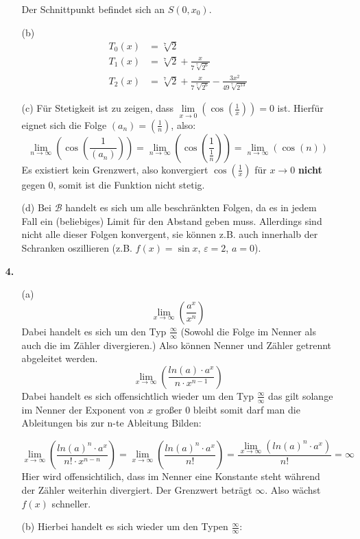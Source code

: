 \documentclass[a4paper,11pt,fleqn]{scrartcl}
\newcommand{\bra}[1]{\left(#1\right)}
\newcommand{\limxn}[2]{\lim\limits_{x \rightarrow #1}\bra{#2}}
\newcommand{\limn}[1]{\lim\limits_{n \rightarrow \infty}\bra{#1}}
\newcommand{\limx}[1]{\lim\limits_{x \rightarrow \infty}\bra{#1}}
\begin{document}
\begin{enumerate}
\begin{enumerate}
                Der Schnittpunkt befindet sich an $S(0, x_0)$.

            \item[(b)]
                \[\begin{array}{ll}
                    T_0(x) &= \sqrt[7]{2} \\[0.5em]
                    T_1(x) &= \sqrt[7]{2} + \frac{x}{7 \sqrt[7]{2^6}} \\[0.5em]
                    T_2(x) &= \sqrt[7]{2} + \frac{x}{7 \sqrt[7]{2^6}} - \frac{3x^2}{49 \sqrt[7]{2^{13}} }
                \end{array}\]

            \item[(c)]
                Für Stetigkeit ist zu zeigen, dass $\limxn{0}{\cos\bra{\frac{1}{x}}} = 0$
                ist. Hierfür eignet sich die Folge $(a_n) = (\frac{1}{n})$, also:
                \[ \limn{\cos\bra{\frac{1}{(a_n)}}} =
                \limn{\cos\bra{\frac{1}{\frac{1}{n}}}} =
                \limn{\cos\bra{n}} \]
                Es existiert kein Grenzwert, also konvergiert $\cos\bra{\frac{1}{x}}$
                für $x \rightarrow 0$ \textbf{nicht} gegen $0$, somit ist die
                Funktion nicht stetig.

            \item[(d)]
                Bei $\mathcal{B}$ handelt es sich um alle beschränkten Folgen, da
                es in jedem Fall ein (beliebiges) Limit für den Abstand geben
                muss. Allerdings sind nicht alle dieser Folgen konvergent, sie
                können z.B. auch innerhalb der Schranken oszillieren (z.B.
                $f(x) = \sin x$, $\varepsilon = 2$, $a = 0$).

        \end{enumerate}
    \item[\textbf{4.}]
        \begin{enumerate}
            \item[(a)]
                \[ \limx{ \frac{a^x}{x^n} }\] Dabei handelt es sich um den Typ $\frac{\infty}{\infty}$ (Sowohl die Folge im Nenner als auch die im Zähler divergieren.)
                Also können Nenner und Zähler getrennt abgeleitet werden. 
                \[\limx{\frac{ln(a) \cdot a^x}{n \cdot x^{n-1}}}\] Dabei handelt es sich offensichtlich wieder um den Typ $\frac{\infty}{\infty}$ das gilt solange im Nenner der Exponent von $x$ großer 0 bleibt somit darf man die Ableitungen bis zur n-te Ableitung Bilden:

                \[\limx{\frac{ln(a)^n \cdot a^x}{n! \cdot x^{n-n}}} = \limx{\frac{ln(a)^n \cdot a^x}{n!}} = \frac{\limx{ln(a)^n \cdot a^x}}{n!} = \infty\]
                Hier wird offensichtilich, dass im Nenner eine Konstante steht während der Zähler weiterhin divergiert. Der Grenzwert beträgt $\infty$. Also wächst $f(x)$ schneller.
            \item[(b)]
                Hierbei handelt es sich wieder um den Typen $\frac{\infty}{\infty}$:


\end{enumerate}
\end{enumerate}
\end{document}
